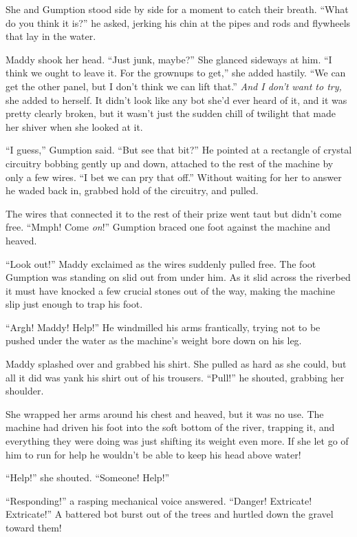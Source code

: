 \documentclass[10pt]{article}
\begin{document}
She and Gumption stood side by side for a moment to catch their breath.
``What do you think it is?'' he asked, jerking his chin at the pipes and
rods and flywheels that lay in the water.

Maddy shook her head. ``Just junk, maybe?'' She glanced sideways at him.
``I think we ought to leave it. For the grownups to get,'' she added
hastily. ``We can get the other panel, but I don't think we can lift
that.'' \emph{And I don't want to try,} she added to herself. It didn't
look like any bot she'd ever heard of it, and it was pretty clearly
broken, but it wasn't just the sudden chill of twilight that made her
shiver when she looked at it.

``I guess,'' Gumption said. ``But see that bit?'' He pointed at a
rectangle of crystal circuitry bobbing gently up and down, attached to
the rest of the machine by only a few wires. ``I bet we can pry that
off.'' Without waiting for her to answer he waded back in, grabbed hold
of the circuitry, and pulled.

The wires that connected it to the rest of their prize went taut but
didn't come free. ``Mmph! Come \emph{on}!'' Gumption braced one foot
against the machine and heaved.

``Look out!'' Maddy exclaimed as the wires suddenly pulled free. The
foot Gumption was standing on slid out from under him. As it slid across
the riverbed it must have knocked a few crucial stones out of the way,
making the machine slip just enough to trap his foot.

``Argh! Maddy! Help!'' He windmilled his arms frantically, trying not to
be pushed under the water as the machine's weight bore down on his leg.

Maddy splashed over and grabbed his shirt. She pulled as hard as she
could, but all it did was yank his shirt out of his trousers. ``Pull!''
he shouted, grabbing her shoulder.

She wrapped her arms around his chest and heaved, but it was no use. The
machine had driven his foot into the soft bottom of the river, trapping
it, and everything they were doing was just shifting its weight even
more. If she let go of him to run for help he wouldn't be able to keep
his head above water!

``Help!'' she shouted. ``Someone! Help!''

``Responding!'' a rasping mechanical voice answered. ``Danger!
Extricate! Extricate!'' A battered bot burst out of the trees and
hurtled down the gravel toward them!
\end{document}
